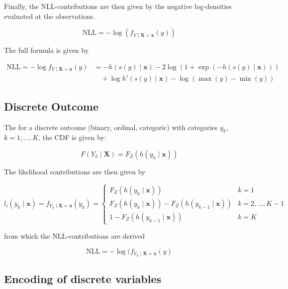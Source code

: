 Finally, the NLL-contributions are then given by the negative log-densities evaluated at the observations.

\begin{equation}
\text{NLL} = - \log (f_{Y \mid \mathbf{X} = \mathbf{x}}(y))
\end{equation}

The full formula is given by

\begin{align}
\text{NLL} = - \log f_{Y \mid \mathbf{X} = \mathbf{x}}(y)
&= -h(s(y) \mid \mathbf{x}) - 2 \log(1 + \exp(-h(s(y) \mid \mathbf{x}))) \nonumber \\
&\quad + \log h'(s(y) \mid \mathbf{x}) - \log(\max(y) - \min(y))
\end{align}




\subsection{Discrete Outcome}


The for a discrete outcome (binary, ordinal, categoric) with categories $y_k$, $k = 1, \ldots, K$, the CDF is given by:

\begin{equation}
F(Y_k \mid \mathbf{X}) = F_Z(h(y_k \mid \mathbf{x}))
\end{equation}

The likelihood contributions are then given by

\begin{equation}
l_i(y_k \mid \mathbf{x}) = f_{Y_k \mid \mathbf{X} = \mathbf{x}}(y_k) =
    \begin{cases}
      F_Z(h(y_k \mid \mathbf{x})) & k=1\\
      F_Z(h(y_k \mid \mathbf{x})) - F_Z(h(y_{k-1} \mid \mathbf{x})) & k=2,\ldots, K-1\\
      1- F_Z(h(y_{k-1} \mid \mathbf{x})) & k = K
    \end{cases}
\end{equation}


from which the NLL-contributions are derived

\begin{equation}
\text{NLL} = - \log (f_{Y_k \mid \mathbf{X} = \mathbf{x}}(y)
\end{equation}



\subsection{Encoding of discrete variables}

